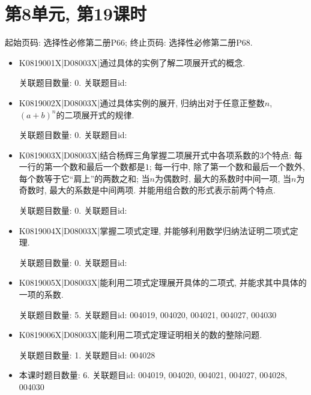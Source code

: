 \section*{第8单元, 第19课时}
起始页码: 选择性必修第二册P66; 终止页码: 选择性必修第二册P68.
\begin{itemize}
\item K0819001X|D08003X|通过具体的实例了解二项展开式的概念.

关联题目数量: 0. 关联题目id: 

\item K0819002X|D08003X|通过具体实例的展开, 归纳出对于任意正整数$n$, $(a+b)^n$的二项展开式的规律.

关联题目数量: 0. 关联题目id: 

\item K0819003X|D08003X|结合杨辉三角掌握二项展开式中各项系数的$3$个特点: 每一行的第一个数和最后一个数都是$1$; 每一行中, 除了第一个数和最后一个数外, 每个数等于它``肩上''的两数之和; 当$n$为偶数时, 最大的系数时中间一项, 当$n$为奇数时, 最大的系数是中间两项. 并能用组合数的形式表示前两个特点.

关联题目数量: 0. 关联题目id: 

\item K0819004X|D08003X|掌握二项式定理, 并能够利用数学归纳法证明二项式定理.

关联题目数量: 0. 关联题目id: 

\item K0819005X|D08003X|能利用二项式定理展开具体的二项式, 并能求其中具体的一项的系数.

关联题目数量: 5. 关联题目id: 004019, 004020, 004021, 004027, 004030

\item K0819006X|D08003X|能利用二项式定理证明相关的数的整除问题.

关联题目数量: 1. 关联题目id: 004028

\item 本课时题目数量: 6. 关联题目id: 004019, 004020, 004021, 004027, 004028, 004030

\end{itemize}

